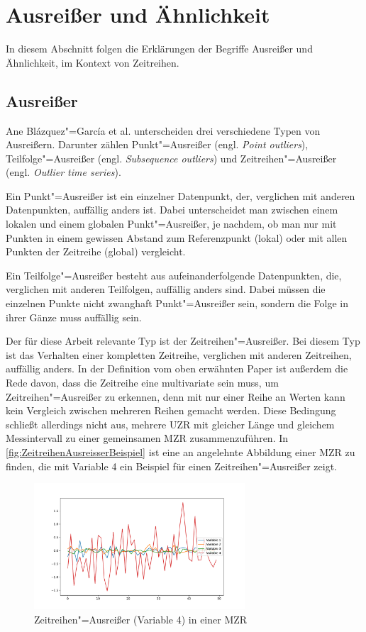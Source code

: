 \section{Ausreißer und Ähnlichkeit}
In diesem Abschnitt folgen die Erklärungen der Begriffe Ausreißer und Ähnlichkeit, im Kontext von Zeitreihen.
\subsection{Ausreißer}
Ane Blázquez"=García et al. \cite[Ch. 2.2]{reviewOutlierDetection} unterscheiden drei verschiedene Typen von Ausreißern. Darunter zählen Punkt"=Ausreißer (engl. \textit{Point outliers}), Teilfolge"=Ausreißer (engl. \textit{Subsequence outliers}) und Zeitreihen"=Ausreißer (engl. \textit{Outlier time series}).

Ein Punkt"=Ausreißer ist ein einzelner Datenpunkt, der, verglichen mit anderen Datenpunkten, auffällig anders ist. Dabei unterscheidet man zwischen einem lokalen und einem globalen Punkt"=Ausreißer, je nachdem, ob man nur mit Punkten in einem gewissen Abstand zum Referenzpunkt (lokal) oder mit allen Punkten der Zeitreihe (global) vergleicht.

Ein Teilfolge"=Ausreißer besteht aus aufeinanderfolgende Datenpunkten, die, verglichen mit anderen Teilfolgen, auffällig anders sind. Dabei müssen die einzelnen Punkte nicht zwanghaft Punkt"=Ausreißer sein, sondern die Folge in ihrer Gänze muss auffällig sein. 

Der für diese Arbeit relevante Typ ist der Zeitreihen"=Ausreißer. Bei diesem Typ ist das Verhalten einer kompletten Zeitreihe, verglichen mit anderen Zeitreihen, auffällig anders. In der Definition vom oben erwähnten Paper \cite{reviewOutlierDetection} ist außerdem die Rede davon, dass die Zeitreihe eine multivariate sein muss, um Zeitreihen"=Ausreißer zu erkennen, denn mit nur einer Reihe an Werten kann kein Vergleich zwischen mehreren Reihen gemacht werden. Diese Bedingung schließt allerdings nicht aus, mehrere \acs{UZR} mit gleicher Länge und gleichem Messintervall zu einer gemeinsamen \acs{MZR} zusammenzuführen. In \autoref{fig:ZeitreihenAusreisserBeispiel} ist eine an \cite[Fig. 5]{reviewOutlierDetection} angelehnte Abbildung einer \acs{MZR} zu finden, die mit Variable 4 ein Beispiel für einen Zeitreihen"=Ausreißer zeigt.
\begin{figure}[bth] 
  \centering
  \includegraphics[width=0.7\textwidth]{Graphics/TimeSeriesOutlierExample.pdf}
  \caption{Zeitreihen"=Ausreißer (Variable 4) in einer \acs{MZR}}
  \label{fig:ZeitreihenAusreisserBeispiel}
\end{figure}

